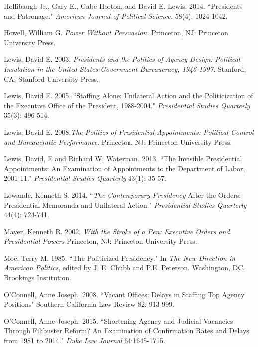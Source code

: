 \documentclass[12pt]{article}
\begin{document}
\noindent \hangindent=0.7cm Hollibaugh Jr., Gary E., Gabe Horton, and David E. Lewis. 2014. ``Presidents and Patronage." \textit{American Journal of Political Science.} 58(4): 1024-1042.

\noindent \hangindent=0.7cm Howell, William G. \textit{Power Without Persuasion.} Princeton, NJ: Princeton University Press.

\noindent \hangindent=0.7cm Lewis, David E. 2003. \textit{Presidents and the Politics of Agency Design: Political Insulation in the United States Government Bureaucracy, 1946-1997.} Stanford, CA: Stanford University Press.

\noindent \hangindent=0.7cm Lewis, David E. 2005. ``Staffing Alone: Unilateral Action and the Politicization of the Executive Office of the President, 1988-2004." \textit{Presidential Studies Quarterly} 35(3): 496-514.

\noindent \hangindent=0.7cm Lewis, David E. 2008.\textit{The Politics of Presidential Appointments: Political Control and Bureaucratic Performance}. Princeton, NJ: Princeton University Press. 

\noindent \hangindent=0.7cm Lewis, David, E and Richard W. Waterman. 2013. ``The Invisible Presidential Appointments: An Examination of Appointments to the Department of Labor, 2001-11.'' \textit{Presidential Studies Quarterly} 43(1): 35-57.

\noindent \hangindent=0.7cm Lowande, Kenneth S. 2014. ``\textit{The Contemporary Presidency} After the Orders: Presidential Memoranda and Unilateral Action." \textit{Presidential Studies Quarterly} 44(4): 724-741.

\noindent \hangindent=0.7cm Mayer, Kenneth R. 2002. \textit{With the Stroke of a Pen: Executive Orders and Presidential Powers} Princeton, NJ: Princeton University Press. 

\noindent \hangindent=0.7cm  Moe, Terry M. 1985. ``The Politicized Presidency." In \textit{The New Direction in American Politics}, edited by J. E. Chubb and P.E. Peterson. Washington, DC. Brookings Institution. 

\noindent \hangindent=0.7cm O'Connell, Anne Joseph. 2008. ``Vacant Offices: Delays in Staffing Top Agency Positions" Southern California Law Review 82: 913-999.

\noindent \hangindent=0.7cm O'Connell, Anne Joseph. 2015. ``Shortening Agency and Judicial Vacancies Through Filibuster Reform? An Examination of Confirmation Rates and Delays from 1981 to 2014." \textit{Duke Law Journal} 64:1645-1715.
\end{document}
